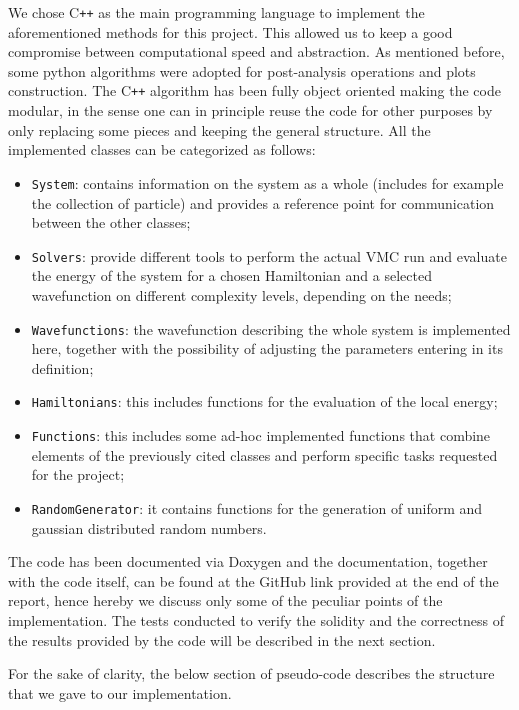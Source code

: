 We chose C\texttt{++} as the main programming language to implement the aforementioned methods for this project. This allowed us to keep a good compromise between computational speed and abstraction. As mentioned before, some python algorithms were adopted for post-analysis operations and plots construction. The C\texttt{++} algorithm has been fully object oriented making the code modular, in the sense one can in principle reuse the code for other purposes by only replacing some pieces and keeping the general structure. All the implemented classes can be categorized as follows:
\begin{itemize}
    \item \texttt{System}: contains information on the system as a whole (includes for example the collection of particle) and provides a reference point for communication between the other classes;
    \item \texttt{Solvers}: provide different tools to perform the actual VMC run and evaluate the energy of the system for a chosen Hamiltonian and a selected wavefunction on different complexity levels, depending on the needs;
    \item \texttt{Wavefunctions}: the wavefunction describing the whole system is implemented here, together with the possibility of adjusting the parameters entering in its definition;
    \item \texttt{Hamiltonians}: this includes functions for the evaluation of the local energy;
    \item \texttt{Functions}: this includes some ad-hoc implemented functions that combine elements of the previously cited classes and perform specific tasks requested for the project;
    \item \texttt{RandomGenerator}: it contains functions for the generation of uniform and gaussian distributed random numbers.
\end{itemize}
The code has been documented via Doxygen and the documentation, together with the code itself, can be found at the GitHub link provided at the end of the report, hence hereby we discuss only some of the peculiar points of the implementation. The tests conducted to verify the solidity and the correctness of the results provided by the code will be described in the next section.

For the sake of clarity, the below section of pseudo-code describes the structure that we gave to our implementation. 
\newpage


